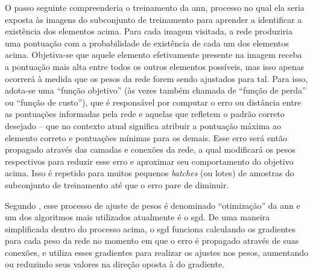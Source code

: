 O passo seguinte compreenderia o treinamento da \acrshort{ann}, processo no qual ela seria exposta às imagens do subconjunto de treinamento para aprender a identificar a existência dos elementos acima. 
Para cada imagem visitada, a rede produziria uma pontuação com a probabilidade de existência de cada um dos elementos acima. Objetiva-se que aquele elemento efetivamente presente na imagem receba a pontuação mais alta entre todos os outros elementos possíveis, mas isso apenas ocorrerá à medida que os pesos da rede forem sendo ajustados para tal.
Para isso, adota-se uma ``função objetivo'' (às vezes também chamada de ``função de perda'' ou ``função de custo''), que é responsável por computar o erro ou distância entre as pontuações informadas pela rede e aquelas que refletem o padrão correto desejado -- que no contexto atual significa atribuir a pontuação máxima ao elemento correto e pontuações mínimas para os demais.
Esse erro será então propagado através das camadas e conexões da rede, a qual modificará os pesos respectivos para reduzir esse erro e aproximar seu comportamento do objetivo acima.
Isso é repetido para muitos pequenos \textit{batches} (ou lotes) de amostras do subconjunto de treinamento até que o erro pare de diminuir. 





Segundo , esse processo de ajuste de pesos é denominado ``otimização'' da \acrshort{ann} e um dos algoritmos mais utilizados atualmente é o \acrfull{sgd}.
De uma maneira simplificada dentro do processo acima, o \acrshort{sgd} funciona calculando os gradientes para cada peso da rede no momento em que o erro é propagado através de suas conexões, e utiliza esses gradientes para realizar os ajustes nos pesos, aumentando ou reduzindo seus valores na direção oposta à do gradiente.


